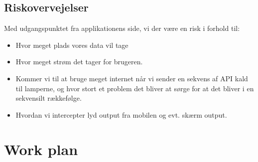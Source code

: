 		\subsection{Riskovervejelser}
		Med udgangspunktet fra applikationens side, vi der være en risk i forhold til:
		\begin{itemize}
			\item Hvor meget plads vores data vil tage
			\item Hvor meget strøm det tager for brugeren. 
			\item Kommer vi til at bruge meget internet når vi sender en sekvens af API kald til lamperne, og hvor stort et problem det bliver at sørge for at det bliver i en sekvensilt rækkefølge.
			\item Hvordan vi intercepter lyd output fra mobilen og evt. skærm output. \newline
		\end{itemize}	
		
		
		\section{Work plan}
		
		
	